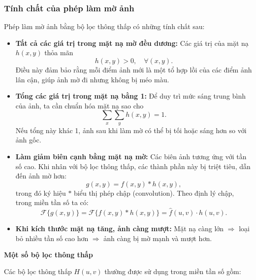 \documentclass[12pt,a4paper]{report}
\numberwithin{equation}{section}
\theoremstyle{definition} %
\begin{document}
\subsubsection*{Tính chất của phép làm mờ ảnh}
Phép làm mờ ảnh bằng bộ lọc thông thấp có những tính chất sau:

\begin{itemize}
	\item \textbf{Tất cả các giá trị trong mặt nạ mờ đều dương:}  
	Các giá trị của mặt nạ $h(x,y)$ thỏa mãn 
	\[
	h(x,y) > 0, \quad \forall (x,y).
	\]
	Điều này đảm bảo rằng mỗi điểm ảnh mới là một tổ hợp lồi của các điểm ảnh lân cận, giúp ảnh mờ đi nhưng không bị méo màu.

	\item \textbf{Tổng các giá trị trong mặt nạ bằng 1:}  
	Để duy trì mức sáng trung bình của ảnh, ta cần chuẩn hóa mặt nạ sao cho
	\[
	\sum_{x}\sum_{y} h(x,y) = 1.
	\]
	Nếu tổng này khác 1, ảnh sau khi làm mờ có thể bị tối hoặc sáng hơn so với ảnh gốc.

	\item \textbf{Làm giảm biên cạnh bằng mặt nạ mờ:}  
	Các biên ảnh tương ứng với tần số cao. Khi nhân với bộ lọc thông thấp, các thành phần này bị triệt tiêu, dẫn đến ảnh mờ hơn:
	\[
	g(x,y) = f(x,y) * h(x,y),
	\]
	trong đó ký hiệu $*$ biểu thị phép chập (convolution). Theo định lý chập, trong miền tần số ta có:
	\[
	\mathcal{F}\{g(x,y)\} = \mathcal{F}\{f(x,y)*h(x,y)\} = \hat{f}(u,v)\cdot\hat{h}(u,v).
	\]

	\item \textbf{Khi kích thước mặt nạ tăng, ảnh càng mượt:}  
	Mặt nạ càng lớn $\Rightarrow$ loại bỏ nhiều tần số cao hơn $\Rightarrow$ ảnh càng bị mờ mạnh và mượt hơn.
\end{itemize}

\begin{center}
\textbf{Một số bộ lọc thông thấp}
\end{center}
Các bộ lọc thông thấp $H(u,v)$ thường được sử dụng trong miền tần số gồm:
\end{document}
